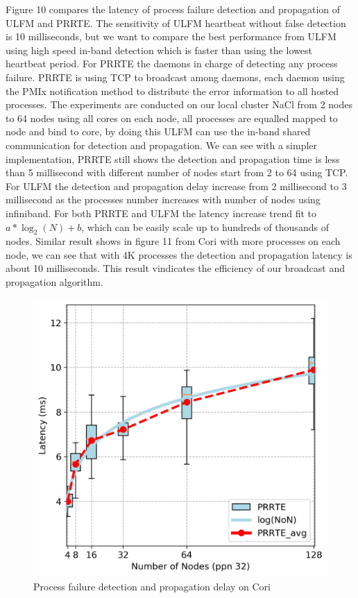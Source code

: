 \documentclass[sigconf]{acmart}
\begin{document}
Figure 10 compares the latency of process failure detection and propagation of ULFM and PRRTE. The sensitivity of ULFM heartbeat without false detection is 10 milliseconds, but we want to compare the best performance from ULFM using high speed in-band detection which is faster than using the lowest heartbeat period. For PRRTE the daemons in charge of detecting any process failure. PRRTE is using TCP to broadcast among daemons, each daemon using the PMIx notification method to distribute the error information to all hosted processes. The experiments are conducted on our local cluster NaCl from 2 nodes to 64 nodes using all cores on each node, all processes are equalled mapped to node and bind to core, by doing this ULFM can use the in-band shared communication for detection and propagation. We can see with a simpler implementation, PRRTE still shows the detection and propagation time is less than 5 millisecond with different number of nodes start from 2 to 64 using TCP. For ULFM the detection and propagation delay increase from 2 millisecond to 3 millisecond as the processes number increases with number of nodes using infiniband. For both PRRTE and ULFM the latency increase trend fit to $ a*\log_2(N) + b $, which can be easily scale up to hundreds of thousands of nodes. Similar result shows in figure 11 from Cori with more processes on each node, we can see that with 4K processes the detection and propagation latency is about 10 milliseconds. This result vindicates the efficiency of our broadcast and propagation algorithm.  

\begin{figure}[h]
  \centering
  \includegraphics[width=\linewidth]{Cori_Process_Failure_fit.png}
  \caption{Process failure detection and propagation delay on Cori}
\end{figure}
\end{document}
